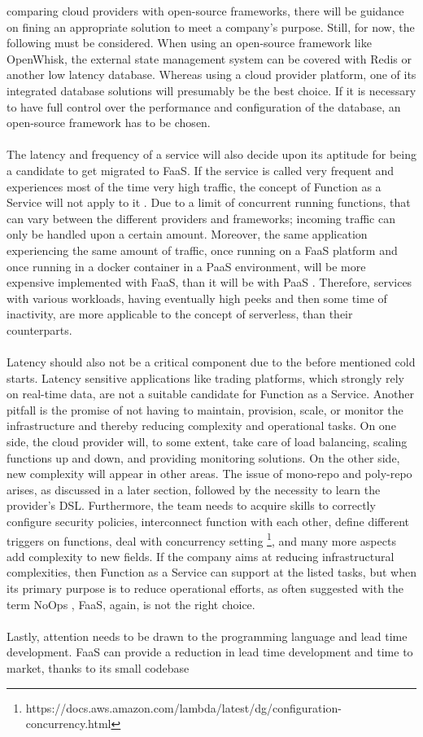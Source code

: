 \documentclass[11pt]{article}
\begin{document}
comparing cloud providers with open-source frameworks, there will be guidance on fining an appropriate solution to meet a company's purpose. Still, for now, the following must be considered. When using an open-source framework like OpenWhisk, the external state management system can be covered with Redis or another low latency database. Whereas using a cloud provider platform, one of its integrated database solutions will presumably be the best choice. If it is necessary to have full control over the performance and configuration of the database, an open-source framework has to be chosen.\\\\ The latency and frequency of a service will also decide upon its aptitude for being a candidate to get migrated to FaaS. If the service is called very frequent and experiences most of the time very high traffic, the concept of Function as a Service will not apply to it  \cite{jonas2019cloud}. Due to a limit of concurrent running functions, that can vary between the different providers and frameworks; incoming traffic can only be handled upon a certain amount. Moreover, the same application experiencing the same amount of traffic, once running on a FaaS platform and once running in a docker container in a PaaS environment, will be more expensive implemented with FaaS, than it will be with PaaS \cite{jonas2019cloud}. Therefore, services with various workloads, having eventually high peeks and then some time of inactivity, are more applicable to the concept of serverless, than their counterparts.\\\\ Latency should also not be a critical component due to the before mentioned cold starts. Latency sensitive applications like trading platforms, which strongly rely on real-time data, are not a suitable candidate for Function as a Service. Another pitfall is the promise of not having to maintain, provision, scale, or monitor the infrastructure and thereby reducing complexity and operational tasks. On one side, the cloud provider will, to some extent, take care of load balancing, scaling functions up and down, and providing monitoring solutions. On the other side, new complexity will appear in other areas. The issue of mono-repo and poly-repo arises, as discussed in a later section, followed by the necessity to learn the provider's DSL. Furthermore, the team needs to acquire skills to correctly configure security policies, interconnect function with each other, define different triggers on functions, deal with concurrency setting \footnote{https://docs.aws.amazon.com/lambda/latest/dg/configuration-concurrency.html}, and many more aspects add complexity to new fields. If the company aims at reducing infrastructural complexities, then Function as a Service can support at the listed tasks, but when its primary purpose is to reduce operational efforts, as often suggested with the term \glqq NoOps\grqq{} \cite{eivy2017wary}, FaaS, again, is not the right choice.\\\\ Lastly, attention needs to be drawn to the programming language and lead time development. FaaS can provide a reduction in lead time development and time to market, thanks to its small codebase 
\end{document}
